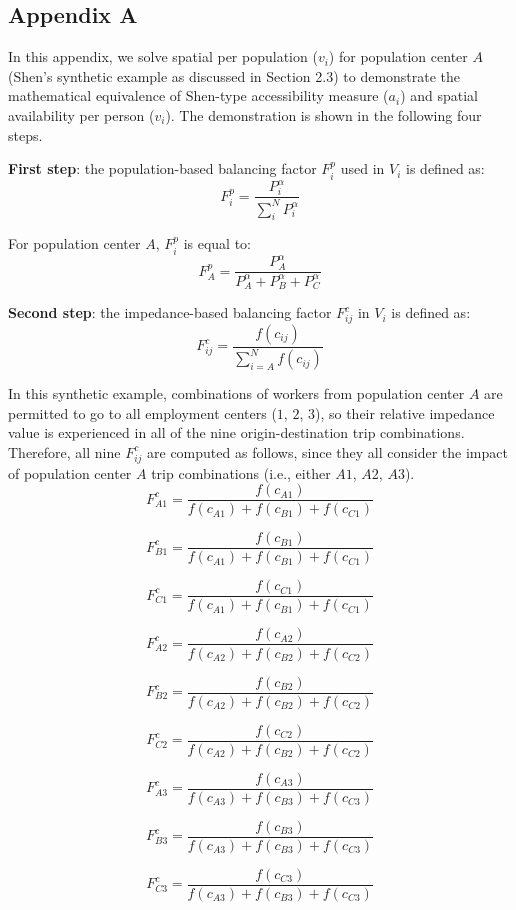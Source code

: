 \documentclass[10pt,letterpaper]{article}
\begin{document}
\begin{landscape}

\section{Appendix A}

In this appendix, we solve spatial per population ($v_i$) for population center $A$ (Shen's synthetic example as discussed in Section 2.3) to demonstrate the mathematical equivalence of Shen-type accessibility measure ($a_i$) and spatial availability per person ($v_i$). The demonstration is shown in the following four steps.

\textbf{First step}: the population-based balancing factor $F^p_{i}$ used in $V_i$ is defined as:
$$
F^p_{i} = \frac{P_{i}^\alpha}{\sum_{i}^N P_{i}^\alpha}
$$

For population center $A$, $F^p_{i}$ is equal to:
$$
F^p_{A} = \frac{P_{A}^\alpha}{P_{A}^\alpha + P_{B}^\alpha + P_{C}^\alpha}
$$

\textbf{Second step}: the impedance-based balancing factor $F^c_{ij}$ in $V_i$ is defined as:
$$
F^c_{ij} = \frac{f(c_{ij})}{\sum_{i=A}^N f(c_{ij})}
$$

In this synthetic example, combinations of workers from population center $A$ are permitted to go to all employment centers ($1$, $2$, $3$), so their relative impedance value is experienced in all of the nine origin-destination trip combinations. Therefore, all nine $F^c_{ij}$ are computed as follows, since they all consider the impact of population center $A$ trip combinations (i.e., either $A1$, $A2$, $A3$).
$$
F^c_{A1} = \frac{f(c_{A1})}{f(c_{A1})+f(c_{B1})+f(c_{C1})}
$$

$$
F^c_{B1} = \frac{f(c_{B1})}{f(c_{A1})+f(c_{B1})+f(c_{C1})}
$$

$$
F^c_{C1} = \frac{f(c_{C1})}{f(c_{A1})+f(c_{B1})+f(c_{C1})}
$$

$$
F^c_{A2} = \frac{f(c_{A2})}{f(c_{A2})+f(c_{B2})+f(c_{C2})}
$$

$$
F^c_{B2} = \frac{f(c_{B2})}{f(c_{A2})+f(c_{B2})+f(c_{C2})}
$$

$$
F^c_{C2} = \frac{f(c_{C2})}{f(c_{A2})+f(c_{B2})+f(c_{C2})}
$$

$$
F^c_{A3} = \frac{f(c_{A3})}{f(c_{A3})+f(c_{B3})+f(c_{C3})}
$$

$$
F^c_{B3} = \frac{f(c_{B3})}{f(c_{A3})+f(c_{B3})+f(c_{C3})}
$$

$$
F^c_{C3} = \frac{f(c_{C3})}{f(c_{A3})+f(c_{B3})+f(c_{C3})}
$$


\end{landscape}
\end{document}
